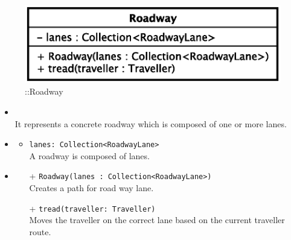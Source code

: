 \begin{figure}[h]
\centering
\includegraphics[scale=0.6,keepaspectratio]{images/solution/app/backend/roadway.eps}
\caption{\pReactiveComponent::Roadway}
\label{fig:sd-app-roadway}
\end{figure}
\FloatBarrier
\begin{itemize}
  \item \textbf{\descr} \\
    It represents a concrete roadway which is composed of one or more lanes.
  \item \textbf{\attrs}
  \begin{itemize}
    \item \texttt{lanes: Collection<RoadwayLane>} \\
A roadway is composed of lanes.
  \end{itemize}
  \item \textbf{\ops}
  \begin{itemize}
  \item[+] \texttt{Roadway(lanes : Collection<RoadwayLane>)} \\
    Creates a path for road way lane.
    \item[+] \texttt{tread(traveller: Traveller)} \\
Moves the traveller on the correct lane based on the current traveller route. 
  \end{itemize}
\end{itemize}
